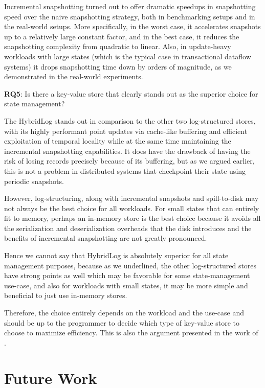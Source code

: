 Incremental snapshotting turned out to offer dramatic speedups in snapshotting speed over the naive snapshotting strategy, both in benchmarking setups and in the real-world setups.
More specifically, in the worst case, it accelerates snapshots up to a relatively large constant factor, and in the best case, it reduces the snapshotting complexity from quadratic to linear.
Also, in update-heavy workloads with large states (which is the typical case in transactional dataflow systems) it drops snapshotting time down by orders of magnitude, as we demonstrated in the real-world experiments.

\begin{tcolorbox}
    \textbf{RQ5}: Is there a key-value store that clearly stands out as the superior choice for state management?
\end{tcolorbox}

The HybridLog stands out in comparison to the other two log-structured stores, with its highly performant point updates via cache-like buffering and efficient exploitation of temporal locality while at the same time maintaining the incremental snapshotting capabilities. It does have the drawback of having the risk of losing records precisely because of its buffering, but as we argued earlier, this is not a problem in distributed systems that checkpoint their state using periodic snapshots.

However, log-structuring, along with incremental snapshots and spill-to-disk may not always be the best choice for all workloads. For small states that can entirely fit to memory, perhaps an in-memory store is the best choice because it avoids all the serialization and deserialization overheads that the disk introduces and the benefits of incremental snapshotting are not greatly pronounced.

Hence we cannot say that HybridLog is absolutely superior for all state management purposes, because as we underlined, the other log-structured stores have strong points as well which may be favorable for some state-management use-case, and also for workloads with small states, it may be more simple and beneficial to just use in-memory stores.

Therefore, the choice entirely depends on the workload and the use-case and should be up to the programmer to decide which type of key-value store to choose to maximize efficiency. This is also the argument presented in the work of \cite{workload-aware-streaming-state-management}.

\section{Future Work}

